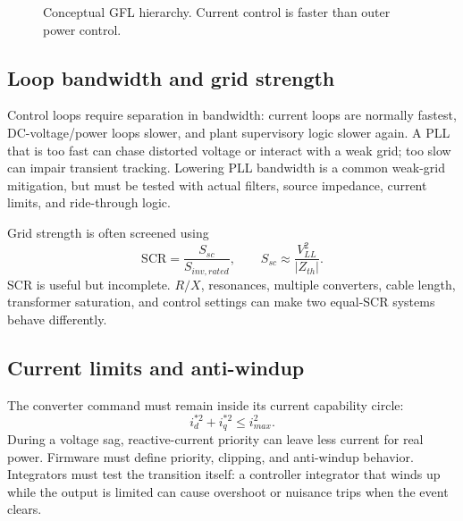\documentclass[11pt]{article}
\begin{document}
\begin{figure}[h]
\centering
{}
\caption{Conceptual GFL hierarchy. Current control is faster than outer power control.}
\end{figure}

\subsection{Loop bandwidth and grid strength}
Control loops require separation in bandwidth: current loops are normally
fastest, DC-voltage/power loops slower, and plant supervisory logic slower
again. A PLL that is too fast can chase distorted voltage or interact with a
weak grid; too slow can impair transient tracking. Lowering PLL bandwidth is a
common weak-grid mitigation, but must be tested with actual filters, source
impedance, current limits, and ride-through logic.

Grid strength is often screened using
\[
\mathrm{SCR}=\frac{S_{sc}}{S_{inv,rated}},\qquad S_{sc}\approx\frac{V_{LL}^2}{|Z_{th}|}.
\]
SCR is useful but incomplete. $R/X$, resonances, multiple converters, cable
length, transformer saturation, and control settings can make two equal-SCR
systems behave differently.

\subsection{Current limits and anti-windup}
The converter command must remain inside its current capability circle:
\[
i_d^{*2}+i_q^{*2}\le i_{max}^2.
\]
During a voltage sag, reactive-current priority can leave less current for real
power. Firmware must define priority, clipping, and anti-windup behavior.
Integrators must test the transition itself: a controller integrator that winds
up while the output is limited can cause overshoot or nuisance trips when the
event clears.
\end{document}
